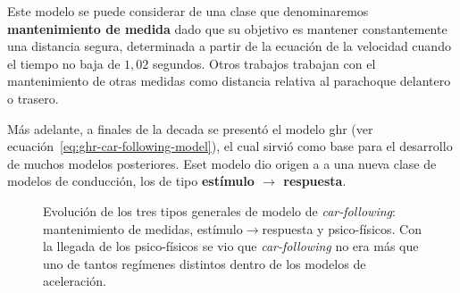 Este modelo se puede considerar de una clase que denominaremos \textbf{mantenimiento de medida} dado que su objetivo es mantener constantemente una distancia segura, determinada a partir de la ecuación de la velocidad cuando el tiempo no baja de $1,02$ segundos. Otros trabajos trabajan con el mantenimiento de otras medidas como distancia relativa al parachoque delantero o trasero.


Más adelante, a finales de la decada se presentó el modelo \gls{ghr} (ver ecuación~\ref{eq:ghr-car-following-model}), el cual sirvió como base para el desarrollo de muchos modelos posteriores. Eset modelo dio origen a a una nueva clase de modelos de conducción, los de tipo \textbf{estímulo $\rightarrow$ respuesta}. 

\begin{figure}[t]
	\begin{center}
		\caption[Evolución de los tres tipos generales de modelo de \textit{car-following}]{Evolución de los tres tipos generales de modelo de \textit{car-following}: mantenimiento de medidas, estímulo$\rightarrow$respuesta y psico-físicos. Con la llegada de los psico-físicos se vio que \textit{car-following} no era más que uno de tantos regímenes distintos dentro de los modelos de aceleración.}
		\label{fig:car-following-there-different-models}
	\end{center}
\end{figure}

